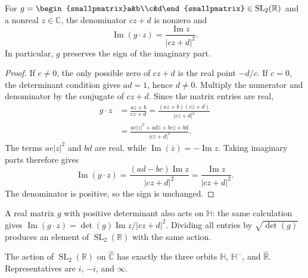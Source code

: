 \begin{lemma}\label{hyperbolic.imaginary-part}
For $g=\begin{smallpmatrix}a&b\\c&d\end{smallpmatrix}\in\operatorname{SL}_2(\mathbb R)$ and a nonreal $z\in\mathbb C$, the denominator $cz+d$ is nonzero and
\begin{equation}\label{eq:mobius-imaginary-part}
 \operatorname{Im}(g\cdot z)=\frac{\operatorname{Im}z}{|cz+d|^2}.
\end{equation}
In particular, $g$ preserves the sign of the imaginary part.
\end{lemma}

\begin{proof}
If $c\ne0$, the only possible zero of $cz+d$ is the real point $-d/c$. If $c=0$, the determinant condition gives $ad=1$, hence $d\ne0$. Multiply the numerator and denominator by the conjugate of $cz+d$. Since the matrix entries are real,
\[
 \begin{aligned}
 g\cdot z
 &=\frac{az+b}{cz+d}
  =\frac{(az+b)(c\overline z+d)}{|cz+d|^2}\\
 &=\frac{ac|z|^2+ad z+bc\overline z+bd}{|cz+d|^2}.
 \end{aligned}
\]
The terms $ac|z|^2$ and $bd$ are real, while $\operatorname{Im}(\overline z)=-\operatorname{Im}z$. Taking imaginary parts therefore gives
\[
 \operatorname{Im}(g\cdot z)
 =\frac{(ad-bc)\operatorname{Im}z}{|cz+d|^2}
 =\frac{\operatorname{Im}z}{|cz+d|^2}.
\]
The denominator is positive, so the sign is unchanged.
\end{proof}

\begin{remark}\label{hyperbolic.positive-determinant}
A real matrix $g$ with positive determinant also acts on $\mathbb H$: the same calculation gives $\operatorname{Im}(g\cdot z)=\det(g)\operatorname{Im}z/|cz+d|^2$. Dividing all entries by $\sqrt{\det(g)}$ produces an element of $\operatorname{SL}_2(\mathbb R)$ with the same action.
\end{remark}

\begin{theorem}\label{hyperbolic.three-orbits}
The action of $\operatorname{SL}_2(\mathbb R)$ on $\widehat{\mathbb C}$ has exactly the three orbits $\mathbb H$, $\mathbb H^-$, and $\widehat{\mathbb R}$. Representatives are $i$, $-i$, and $\infty$.
\end{theorem}

